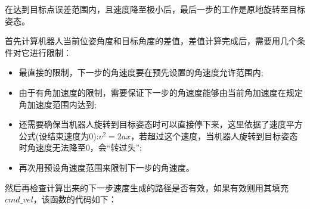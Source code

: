 \documentclass[9pt, oneside]{book}
\begin{document}
在达到目标点误差范围内，且速度降至极小后，最后一步的工作是原地旋转至目标姿态。

首先计算机器人当前位姿角度和目标角度的差值，差值计算完成后，需要用几个条件对它进行限制：

\begin{itemize}
    \item 最直接的限制，下一步的角速度要在预先设置的角速度允许范围内;
    \item 由于有角加速度的限制，需要保证下一步的角速度能够由当前角加速度在规定角加速度范围内达到;
    \item 还需要确保当机器人旋转到目标姿态时可以直接停下来，这里依据了速度平方公式(设结束速度为0):$v^2 = 2ax$，若超过这个速度，当机器人旋转到目标姿态时角速度无法降至0，会“转过头”;
    \item 再次用预设角速度范围来限制下一步的角速度。
\end{itemize}

然后再检查计算出来的下一步速度生成的路径是否有效，如果有效则用其填充$cmd\_vel$，该函数的代码如下：
\end{document}
